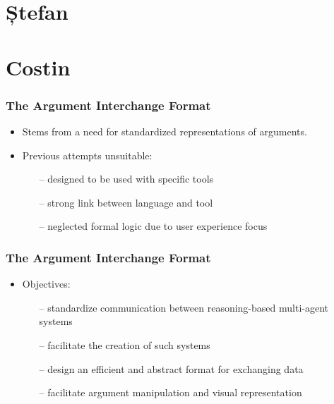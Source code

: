\documentclass{beamer}
\begin{document}
\section{Ștefan}

\section{Costin}
\begin{frame}
\frametitle{The Argument Interchange Format}
\begin{itemize}
\item Stems from a need for standardized representations of arguments. \pause
\item Previous attempts unsuitable: \pause
  \begin{itemize}
  \item[--] designed to be used with specific tools \pause
  \item[--] strong link between language and tool \pause
  \item[--] neglected formal logic due to user experience focus
  \end{itemize}
\end{itemize}
\end{frame}

\begin{frame}
\frametitle{The Argument Interchange Format}
\begin{itemize}
\item Objectives: \pause
  \begin{itemize}
  \item[--] standardize communication between reasoning-based multi-agent systems \pause
  \item[--] facilitate the creation of such systems \pause
  \item[--] design an efficient and abstract format for exchanging data \pause
  \item[--] facilitate argument manipulation and visual representation
  \end{itemize}
\end{itemize}
\end{frame}
\end{document}

